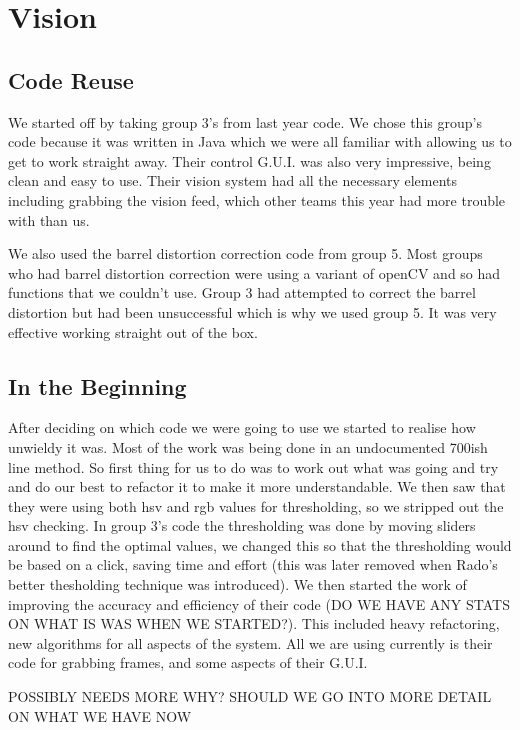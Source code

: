 \section{Vision}

\subsection{Code Reuse}

We started off by taking group 3's from last year code.  We chose this group's code because it was written in Java which we were all familiar with allowing us to get to work straight away.  Their control G.U.I. was also very impressive, being clean and easy to use.  Their vision system had all the necessary elements including grabbing the vision feed, which other teams this year had more trouble with than us.

We also used the barrel distortion correction code from group 5.  Most groups who had barrel distortion correction were using a variant of openCV and so had functions that we couldn't use.  Group 3 had attempted to correct the barrel distortion but had been unsuccessful which is why we used group 5.  It was very effective working straight out of the box.

\subsection{In the Beginning}

After deciding on which code we were going to use we started to realise how unwieldy it was.  Most of the work was being done in an undocumented 700ish line method.  So first thing for us to do was to work out what was going and try and do our best to refactor it to make it more understandable.  We then saw that they were using both hsv and rgb values for thresholding, so we stripped out the hsv checking.  In group 3's code the thresholding was done by moving sliders around to find the optimal values, we changed this so that the thresholding would be based on a click, saving time and effort (this was later removed when Rado's better thesholding technique was introduced).  We then started the work of improving the accuracy and efficiency of their code (DO WE HAVE ANY STATS ON WHAT IS WAS WHEN WE STARTED?).  This included heavy refactoring, new algorithms for all aspects of the system.  All we are using currently is their code for grabbing frames, and some aspects of their G.U.I.

POSSIBLY NEEDS MORE WHY?  SHOULD WE GO INTO MORE DETAIL ON WHAT WE HAVE NOW





